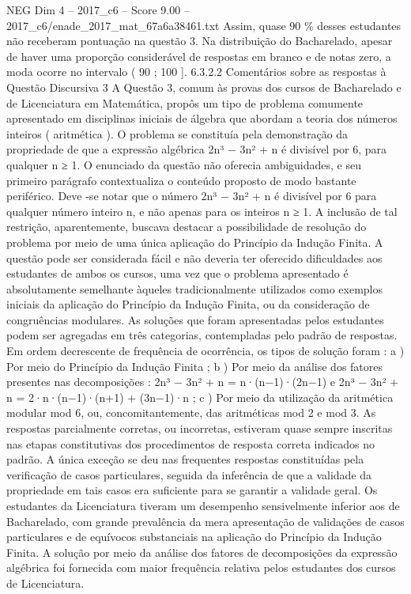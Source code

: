 \begin{textsample}{NEG Dim 4 – 2017\_c6 – Score 9.00 – 2017\_c6/enade\_2017\_mat\_67a6a38461.txt}
Assim, quase 90 \% desses estudantes não receberam pontuação na questão 3.
Na distribuição do Bacharelado, apesar de haver uma proporção considerável de respostas em branco e de notas zero, a moda ocorre no intervalo ( 90 ; 100 ]. 6.3.2.2 Comentários sobre as respostas à Questão Discursiva 3 A Questão 3, comum às provas dos cursos de Bacharelado e de Licenciatura em Matemática, propôs um tipo de problema comumente apresentado em disciplinas iniciais de álgebra que abordam a teoria dos números inteiros ( aritmética ).
O problema se constituía pela demonstração da propriedade de que a expressão algébrica 2n³ − 3n² + n é divisível por 6, para qualquer n ≥ 1.
O enunciado da questão não oferecia ambiguidades, e seu primeiro parágrafo contextualiza o conteúdo proposto de modo bastante periférico.
Deve -se notar que o número 2n³ − 3n² + n é divisível por 6 para qualquer número inteiro n, e não apenas para os inteiros n ≥ 1.
A inclusão de tal restrição, aparentemente, buscava destacar a possibilidade de resolução do problema por meio de uma única aplicação do Princípio da Indução Finita.
A questão pode ser considerada fácil e não deveria ter oferecido dificuldades aos estudantes de ambos os cursos, uma vez que o problema apresentado é absolutamente semelhante àqueles tradicionalmente utilizados como exemplos iniciais da aplicação do Princípio da Indução Finita, ou da consideração de congruências modulares.
As soluções que foram apresentadas pelos estudantes podem ser agregadas em três categorias, contempladas pelo padrão de respostas.
Em ordem decrescente de frequência de ocorrência, os tipos de solução foram : a ) Por meio do Princípio da Indução Finita ; b ) Por meio da análise dos fatores presentes nas decomposições : 2n³ − 3n² + n = n·(n−1)·(2n−1) e 2n³ − 3n² + n = 2·n·(n−1)·(n+1) + (3n−1)·n ; c ) Por meio da utilização da aritmética modular mod 6, ou, concomitantemente, das aritméticas mod 2 e mod 3.
As respostas parcialmente corretas, ou incorretas, estiveram quase sempre inscritas nas etapas constitutivas dos procedimentos de resposta correta indicados no padrão.
A única exceção se deu nas frequentes respostas constituídas pela verificação de casos particulares, seguida da inferência de que a validade da propriedade em tais casos era suficiente para se garantir a validade geral.
Os estudantes da Licenciatura tiveram um desempenho sensivelmente inferior aos de Bacharelado, com grande prevalência da mera apresentação de validações de casos particulares e de equívocos substanciais na aplicação do Princípio da Indução Finita.
A solução por meio da análise dos fatores de decomposições da expressão algébrica foi fornecida com maior frequência relativa pelos estudantes dos cursos de Licenciatura.

\end{textsample}
